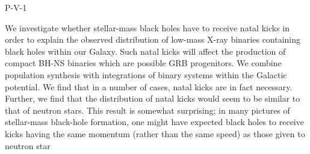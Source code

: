 P-V-1


\bigskip



\bigskip

\noindent We investigate whether stellar-mass black holes have to receive natal kicks in order to explain the observed distribution of low-mass X-ray binaries containing black holes within our Galaxy. Such natal kicks will affect the production of compact BH-NS binaries which are possible GRB progenitors.
We combine population synthesis  with integrations of binary systems within the Galactic potential. We find that in a number of cases, natal kicks are in fact necessary. Further, we find that the distribution of natal kicks would seem to be similar to that of neutron stars. This result is somewhat surprising; in many pictures of stellar-mass black-hole formation, one might have expected black holes to receive kicks having the same momentum (rather than the same speed) as those given to neutron star

